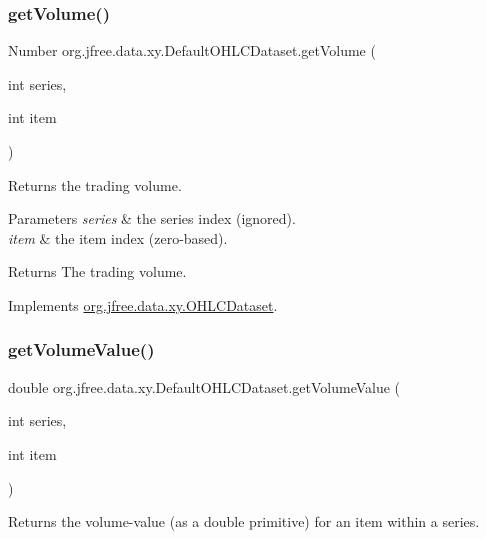 \subsubsection{\texorpdfstring{get\+Volume()}{getVolume()}}
{\footnotesize\ttfamily Number org.\+jfree.\+data.\+xy.\+Default\+O\+H\+L\+C\+Dataset.\+get\+Volume (\begin{DoxyParamCaption}\item[{int}]{series,  }\item[{int}]{item }\end{DoxyParamCaption})}

Returns the trading volume.


\begin{DoxyParams}{Parameters}
{\em series} & the series index (ignored). \\
\hline
{\em item} & the item index (zero-\/based).\\
\hline
\end{DoxyParams}
\begin{DoxyReturn}{Returns}
The trading volume. 
\end{DoxyReturn}


Implements \mbox{\hyperlink{interfaceorg_1_1jfree_1_1data_1_1xy_1_1_o_h_l_c_dataset_a05012f783f010c1a62873a0c40e7b7fa}{org.\+jfree.\+data.\+xy.\+O\+H\+L\+C\+Dataset}}.

\mbox{\label{classorg_1_1jfree_1_1data_1_1xy_1_1_default_o_h_l_c_dataset_ab7daa41ae6b486616cc15c3b90212c15}} 
\subsubsection{\texorpdfstring{get\+Volume\+Value()}{getVolumeValue()}}
{\footnotesize\ttfamily double org.\+jfree.\+data.\+xy.\+Default\+O\+H\+L\+C\+Dataset.\+get\+Volume\+Value (\begin{DoxyParamCaption}\item[{int}]{series,  }\item[{int}]{item }\end{DoxyParamCaption})}

Returns the volume-\/value (as a double primitive) for an item within a series.


